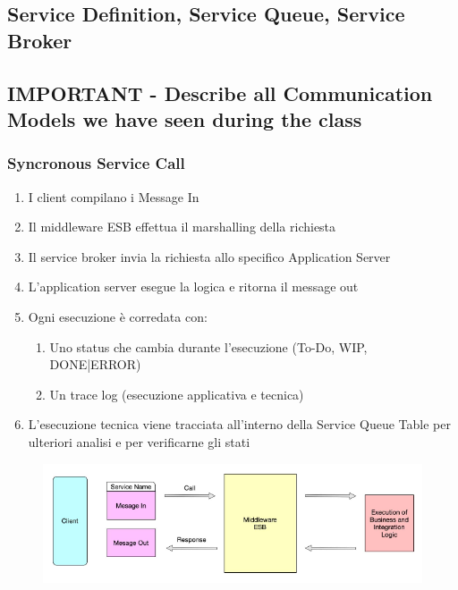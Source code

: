 \documentclass{article}
\begin{document}
\subsection{Service Definition, Service Queue, Service Broker}
\subsection{IMPORTANT - Describe all Communication Models we have seen during the class}
\subsubsection{Syncronous Service Call}

\begin{enumerate}
    \item I client compilano i Message In
    \item Il middleware ESB effettua il marshalling della richiesta
    \item Il service broker invia la richiesta allo specifico Application Server
    \item L'application server esegue la logica e ritorna il message out
    \item Ogni esecuzione è corredata con:
    \begin{enumerate}
        \item Uno status che cambia durante l'esecuzione (To-Do, WIP, DONE|ERROR)
        \item Un trace log (esecuzione applicativa e tecnica)
    \end{enumerate}
    \item L'esecuzione tecnica viene tracciata all'interno della Service Queue Table per ulteriori analisi e per verificarne gli stati
\end{enumerate}

\begin{figure}[htp]
    \centering
    \includegraphics[width=\linewidth]{fig/synchronous_service_call.png}
    \label{fig:Synchronous service call}
\end{figure}
\end{document}
